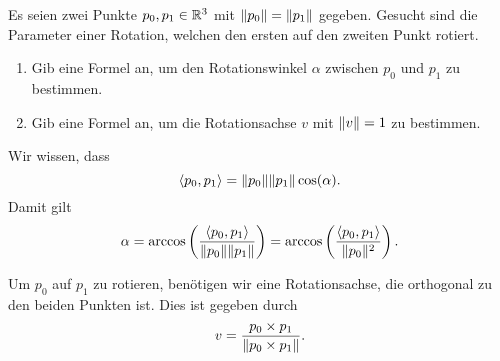 \documentclass[headsepline, usegeometry]{scrreprt}
\begin{document}
\begin{exercise}
    Es seien zwei Punkte \(p_{0},p_{1} \in \mathbb{R}^{3}\) mit \(\lVert p_{0}\rVert=\lVert p_{1}\rVert\) gegeben.
    Gesucht sind die Parameter einer Rotation, welchen den ersten auf den zweiten Punkt rotiert.
    \begin{enumerate}[label = (\alph*)]
        \item Gib eine Formel an, um den Rotationswinkel \(\alpha\) zwischen \(p_{0}\) und \(p_{1}\) zu bestimmen.\label{ex:1a}
        \item Gib eine Formel an, um die Rotationsachse \(v\) mit \(\lVert v\rVert=1\) zu bestimmen.\label{ex:1b}
    \end{enumerate}  
\end{exercise}
\begin{solution}[\ref{ex:1a}]
    Wir wissen, dass 
    \begin{equation*}
        \langle p_{0},p_{1} \rangle = \lVert p_{0}\rVert\lVert p_{1}\rVert\cos(\alpha).
    \end{equation*}
    Damit gilt
    \begin{equation*}
        \alpha = \arccos\left(\frac{\langle p_{0},p_{1} \rangle}{\lVert p_{0}\rVert\lVert p_{1}\rVert}\right) = \arccos\left(\frac{\langle p_{0},p_{1} \rangle}{\lVert p_{0}\rVert^{2}}\right).
    \end{equation*}
\end{solution}
\begin{solution}[\ref{ex:1b}]
    Um \(p_{0}\) auf \(p_{1}\) zu rotieren, benötigen wir eine Rotationsachse, die orthogonal zu den beiden Punkten ist.
    Dies ist gegeben durch
    \begin{equation*}
        v = \frac{p_{0} \times p_{1}}{\lVert p_{0} \times p_{1}\rVert}.
    \end{equation*}  
\end{solution}
\end{document}
